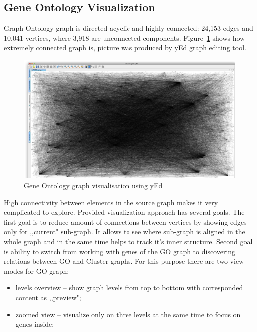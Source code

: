 \subsection{Gene Ontology Visualization}
\label{sec:go}

Graph Ontology graph is directed acyclic and highly connected: 24,153 edges and 10,041 vertices, where 3,918 are unconnected components. Figure~\ref{fig:go_connections_yEd} shows how extremely connected graph is, picture was produced by yEd graph editing tool.

\begin{figure}
\centering
\includegraphics[scale=0.2]{pictures/yEd_GO_2.png}
\caption{Gene Ontology graph visualisation using yEd}
\label{fig:go_connections_yEd}
\end{figure}

High connectivity between elements in the source graph makes it very complicated to explore. Provided visualization approach has several goals. The first goal is to reduce amount of connections between vertices by showing edges only for ,,current" sub-graph. It allows to see where sub-graph is aligned in the whole graph and in the same time helps to track it's inner structure. Second goal is ability to switch from working with genes of the GO graph to discovering relations between GO and Cluster graphs. For this purpose there are two view modes for GO graph:

\begin{itemize}
   \item levels overview -- show graph levels from top to bottom with corresponded content as ,,preview";
   \item zoomed view -- visualize only on three levels at the same time to focus on genes inside;
\end{itemize}

